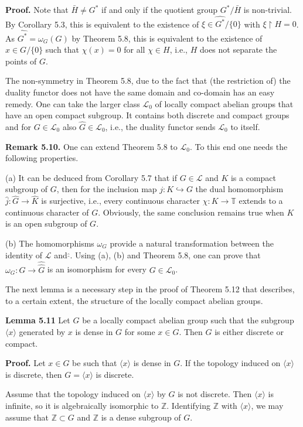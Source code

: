\documentclass[12pt]{article}
\begin{document}
    \textbf{Proof.} Note that $\bar{H} \neq G^*$ if and only if the quotient group $G^* / \bar{H}$ is non-trivial. By Corollary 5.3, this is equivalent to the
existence of $\xi \in \hat{G^*} / \{0\}$ with $\xi \upharpoonright H = 0$. As $\hat{G^*} = \omega_G (G)$ by Theorem 5.8, this is equivalent to the existence of $x \in G / \{ 0 \}$
such that $\chi(x) = 0$ for all $\chi \in H$, i.e., $H$ does not separate the points of $G$. 


    The non-symmetry in Theorem 5.8, due to the fact that (the restriction of) the duality functor does not have the same
domain and co-domain has an easy remedy. One can take the larger class $\mathcal{L}_0$ of locally compact abelian groups that have an
open compact subgroup. It contains both discrete and compact groups and for $G \in \mathcal{L}_0$ also $\hat{G} \in \mathcal{L}_0$, i.e., the duality functor
sends $\mathcal{L}_0$ to itself.


    \textbf{Remark 5.10.} One can extend Theorem 5.8 to $\mathcal{L}_0$. To this end one needs the following properties.


    (a) It can be deduced from Corollary 5.7 that if $G \in \mathcal{L}$ and $K$ is a compact subgroup of $G$, then for the inclusion
map $j : K \hookrightarrow G$ the dual homomorphism $\hat{j} : \hat{G} \to \hat{K}$ is surjective, i.e., every continuous character $\chi : K \to \mathbb{T}$ extends to a
continuous character of $G$. Obviously, the same conclusion remains true when $K$ is an open subgroup of $G$.


    (b) The homomorphisms $\omega_G$ provide a natural transformation between the identity of $\mathcal{L}$ and $\hat{\hat{ }}$.
Using (a), (b) and Theorem 5.8, one can prove that $\omega_G : G \to \hat{\hat{G}}$ is an isomorphism for every $G \in \mathcal{L}_0$.


    The next lemma is a necessary step in the proof of Theorem 5.12 that describes, to a certain extent, the structure of the
locally compact abelian groups.


    \textbf{Lemma 5.11} Let $G$ be a locally compact abelian group such that the subgroup $\langle x \rangle$ generated by $x$ is dense in $G$ for some $x \in G$. Then $G$
is either discrete or compact.


    \textbf{Proof.} Let $x \in G$ be such that $\langle x \rangle$ is dense in $G$. If the topology induced on $\langle x \rangle$ is discrete, then $G = \langle x \rangle$ is discrete.
    
    
    Assume that the topology induced on $\langle x \rangle$ by $G$ is not discrete. Then $\langle x \rangle$ is infinite, so it is algebraically isomorphic to $\mathbb{Z}$.
Identifying $\mathbb{Z}$ with $\langle x \rangle$, we may assume that $\mathbb{Z} \subset G$ and $\mathbb{Z}$ is a dense subgroup of $G$.
    
\end{document}
